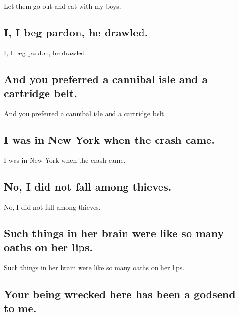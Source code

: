 \documentclass[]{article}
\begin{document}
Let them go out and eat with my boys.

\hypertarget{i-i-beg-pardon-he-drawled.}{%
\subsection{I, I beg pardon, he
drawled.}\label{i-i-beg-pardon-he-drawled.}}

I, I beg pardon, he drawled.

\hypertarget{and-you-preferred-a-cannibal-isle-and-a-cartridge-belt.}{%
\subsection{And you preferred a cannibal isle and a cartridge
belt.}\label{and-you-preferred-a-cannibal-isle-and-a-cartridge-belt.}}

And you preferred a cannibal isle and a cartridge belt.

\hypertarget{i-was-in-new-york-when-the-crash-came.}{%
\subsection{I was in New York when the crash
came.}\label{i-was-in-new-york-when-the-crash-came.}}

I was in New York when the crash came.

\hypertarget{no-i-did-not-fall-among-thieves.}{%
\subsection{No, I did not fall among
thieves.}\label{no-i-did-not-fall-among-thieves.}}

No, I did not fall among thieves.

\hypertarget{such-things-in-her-brain-were-like-so-many-oaths-on-her-lips.}{%
\subsection{Such things in her brain were like so many oaths on her
lips.}\label{such-things-in-her-brain-were-like-so-many-oaths-on-her-lips.}}

Such things in her brain were like so many oaths on her lips.

\hypertarget{your-being-wrecked-here-has-been-a-godsend-to-me.}{%
\subsection{Your being wrecked here has been a godsend to
me.}\label{your-being-wrecked-here-has-been-a-godsend-to-me.}}
\end{document}
